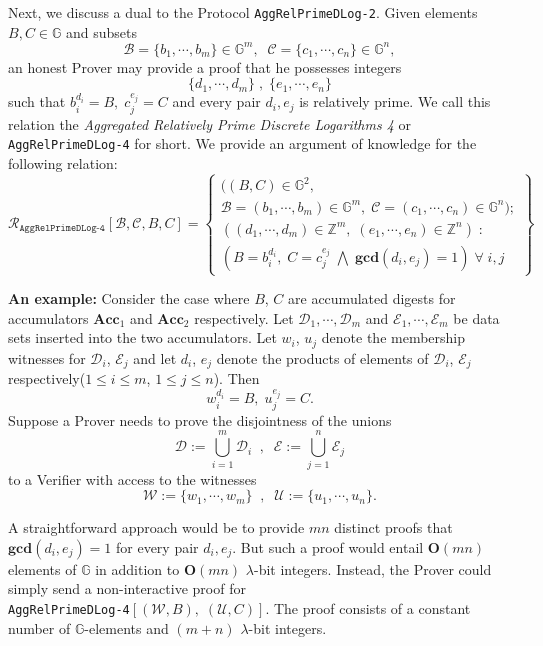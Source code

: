 \documentclass[11pt, lettersize, notitlepage, leqno, footskip=0.6cm]{article}
\newcommand{\bz}{\mathbb Z}
\newcommand{\ttt}{\texttt}
\newcommand{\Acc}{\mbf{Acc}}
\newcommand{\mc}{\mathcal}
\newcommand{\mb}{\mathbb}
\newcommand{\mbf}{\mathbf}
\newcommand{\lamb}{\lambda}
\newcommand{\vs}{\vspace{-0.15cm}}
\newcommand{\GCD}{\mbf{gcd}}
\numberwithin{equation}{section}
\begin{document}
Next, we discuss a dual to the Protocol \verb|AggRelPrimeDLog-2|. Given elements $B, C\in \mb{G}$ and subsets \vspace{-0.15cm}$$\mc{B} = \{b_1,\cdots, b_m\}\in \mb{G}^m,\;\; \mc{C} = \{c_1,\cdots, c_n\}\in \mb{G}^n,$$ an honest Prover may provide a proof that he possesses integers \vs $$\{d_1,\cdots, d_m\}\;,\; \{e_1,\cdots, e_n\}$$ such that $b_i^{d_i} = B,\; c_j^{e_j} = C$ and every pair $d_i, e_j$ is relatively prime. We call this relation the \textit{Aggregated Relatively Prime Discrete Logarithms 4} or \verb|AggRelPrimeDLog-4| for short. We provide an argument of knowledge for the following relation:
\[
  \mc{R}_{\ttt{AggRelPrimeDLog-4}}[\mc{B}, \mc{C}, B, C] = \left\{\begin{array}{l}
    ((B,C)\in\mb{G}^2,\;\\
     \mc{B} = (b_1,\cdots,b_m)\in\mb{G}^m,\;\mc{C} = (c_1,\cdots, c_n)\in\mb{G}^n);\\
    ((d_1,\cdots,d_m)\in\bz^m,\; (e_1,\cdots,e_n)\in\bz^n)\;: \\
    (B = b_i^{d_i},\; C = c_j^{e_j}\;\bigwedge \; \GCD(d_i, e_j) = 1)\;\forall \;i,j
  \end{array}\right\}
\] 

\noindent \textbf{An example:} Consider the case where $B$, $C$ are accumulated digests for accumulators $\Acc_1$ and $\Acc_2$ respectively. Let $\mc{D}_1,\cdots,\mc{D}_m$ and $\mc{E}_1,\cdots,\mc{E}_m$ be data sets inserted into the two accumulators. Let $w_i$, $u_j$ denote the membership witnesses for $\mc{D}_i$, $\mc{E}_j$ and let $d_i$, $e_j$ denote the products of elements of $\mc{D}_i$, $\mc{E}_j$ respectively($1\leq i\leq m$, $1\leq j\leq n$). Then $$w_i^{d_i} = B,\; u_j^{e_j} = C.$$ Suppose a Prover needs to prove the disjointness of the unions $$\mc{D} := \bigcup\limits_{i=1}^m \mc{D}_i\;\;,\;\;\mc{E} := \bigcup\limits_{j=1}^n \mc{E}_j$$ to a Verifier with access to the witnesses \vspace{-0.15cm}$$\mc{W}:= \{w_1,\cdots,w_m \}\;\;,\;\;\mc{U}:= \{u_1,\cdots,u_n \}.$$

A straightforward approach would be to provide $mn$ distinct proofs that $\GCD(d_i, e_j) = 1$ for every pair $d_i,e_j$. But such a proof would entail $\mbf{O}(mn)$ elements of $\mb{G}$ in addition to $\mbf{O}(mn)$ $\lamb$-bit integers. Instead, the Prover could simply send a non-interactive proof for\\ \verb|AggRelPrimeDLog-4|$[(\mc{W}, B),\;(\mc{U}, C)]$. The proof consists of a constant number of $\mb{G}$-elements and $(m+n)$ $\lamb$-bit integers.\vspace{0.1cm} 
\end{document}
